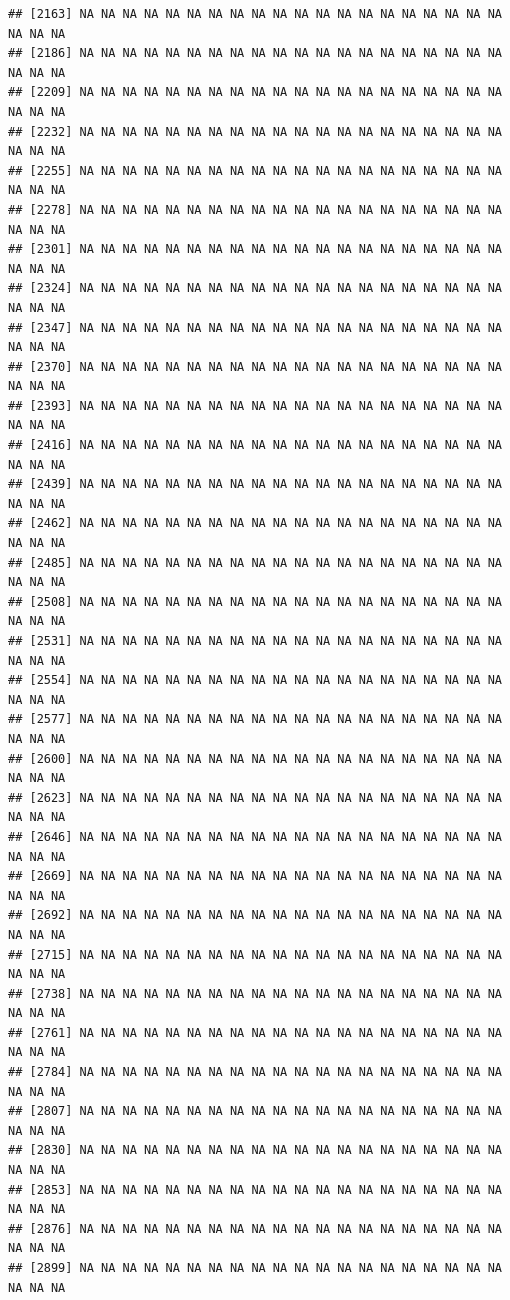 \documentclass{article}\usepackage[]{graphicx}\usepackage[]{color}
\makeatletter
\newenvironment{kframe}{%
 \def\at@end@of@kframe{}%
 \ifinner\ifhmode%
  \def\at@end@of@kframe{\end{minipage}}%
  \begin{minipage}{\columnwidth}%
 \fi\fi%
 \def\FrameCommand##1{\hskip\@totalleftmargin \hskip-\fboxsep
 \colorbox{shadecolor}{##1}\hskip-\fboxsep
     \hskip-\linewidth \hskip-\@totalleftmargin \hskip\columnwidth}%
 \MakeFramed {\advance\hsize-\width
   \@totalleftmargin\z@ \linewidth\hsize
   \@setminipage}}%
 {\par\unskip\endMakeFramed%
 \at@end@of@kframe}
\newenvironment{knitrout}{}{} %
\makeatother
\begin{document}
\begin{knitrout}
\begin{kframe}
\begin{verbatim}
## [2163] NA NA NA NA NA NA NA NA NA NA NA NA NA NA NA NA NA NA NA NA NA NA NA
## [2186] NA NA NA NA NA NA NA NA NA NA NA NA NA NA NA NA NA NA NA NA NA NA NA
## [2209] NA NA NA NA NA NA NA NA NA NA NA NA NA NA NA NA NA NA NA NA NA NA NA
## [2232] NA NA NA NA NA NA NA NA NA NA NA NA NA NA NA NA NA NA NA NA NA NA NA
## [2255] NA NA NA NA NA NA NA NA NA NA NA NA NA NA NA NA NA NA NA NA NA NA NA
## [2278] NA NA NA NA NA NA NA NA NA NA NA NA NA NA NA NA NA NA NA NA NA NA NA
## [2301] NA NA NA NA NA NA NA NA NA NA NA NA NA NA NA NA NA NA NA NA NA NA NA
## [2324] NA NA NA NA NA NA NA NA NA NA NA NA NA NA NA NA NA NA NA NA NA NA NA
## [2347] NA NA NA NA NA NA NA NA NA NA NA NA NA NA NA NA NA NA NA NA NA NA NA
## [2370] NA NA NA NA NA NA NA NA NA NA NA NA NA NA NA NA NA NA NA NA NA NA NA
## [2393] NA NA NA NA NA NA NA NA NA NA NA NA NA NA NA NA NA NA NA NA NA NA NA
## [2416] NA NA NA NA NA NA NA NA NA NA NA NA NA NA NA NA NA NA NA NA NA NA NA
## [2439] NA NA NA NA NA NA NA NA NA NA NA NA NA NA NA NA NA NA NA NA NA NA NA
## [2462] NA NA NA NA NA NA NA NA NA NA NA NA NA NA NA NA NA NA NA NA NA NA NA
## [2485] NA NA NA NA NA NA NA NA NA NA NA NA NA NA NA NA NA NA NA NA NA NA NA
## [2508] NA NA NA NA NA NA NA NA NA NA NA NA NA NA NA NA NA NA NA NA NA NA NA
## [2531] NA NA NA NA NA NA NA NA NA NA NA NA NA NA NA NA NA NA NA NA NA NA NA
## [2554] NA NA NA NA NA NA NA NA NA NA NA NA NA NA NA NA NA NA NA NA NA NA NA
## [2577] NA NA NA NA NA NA NA NA NA NA NA NA NA NA NA NA NA NA NA NA NA NA NA
## [2600] NA NA NA NA NA NA NA NA NA NA NA NA NA NA NA NA NA NA NA NA NA NA NA
## [2623] NA NA NA NA NA NA NA NA NA NA NA NA NA NA NA NA NA NA NA NA NA NA NA
## [2646] NA NA NA NA NA NA NA NA NA NA NA NA NA NA NA NA NA NA NA NA NA NA NA
## [2669] NA NA NA NA NA NA NA NA NA NA NA NA NA NA NA NA NA NA NA NA NA NA NA
## [2692] NA NA NA NA NA NA NA NA NA NA NA NA NA NA NA NA NA NA NA NA NA NA NA
## [2715] NA NA NA NA NA NA NA NA NA NA NA NA NA NA NA NA NA NA NA NA NA NA NA
## [2738] NA NA NA NA NA NA NA NA NA NA NA NA NA NA NA NA NA NA NA NA NA NA NA
## [2761] NA NA NA NA NA NA NA NA NA NA NA NA NA NA NA NA NA NA NA NA NA NA NA
## [2784] NA NA NA NA NA NA NA NA NA NA NA NA NA NA NA NA NA NA NA NA NA NA NA
## [2807] NA NA NA NA NA NA NA NA NA NA NA NA NA NA NA NA NA NA NA NA NA NA NA
## [2830] NA NA NA NA NA NA NA NA NA NA NA NA NA NA NA NA NA NA NA NA NA NA NA
## [2853] NA NA NA NA NA NA NA NA NA NA NA NA NA NA NA NA NA NA NA NA NA NA NA
## [2876] NA NA NA NA NA NA NA NA NA NA NA NA NA NA NA NA NA NA NA NA NA NA NA
## [2899] NA NA NA NA NA NA NA NA NA NA NA NA NA NA NA NA NA NA NA NA NA NA NA

\end{verbatim}
\end{kframe}
\end{knitrout}
\end{document}
